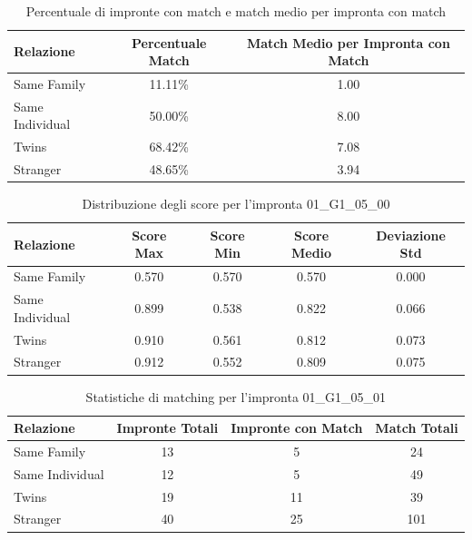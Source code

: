 \begin{table}[htbp]
\centering
\caption{Percentuale di impronte con match e match medio per impronta con match}
\label{tab:match_percentage_01_G1_05_00}
\begin{tabular}{|l|c|c|}
\hline
\textbf{Relazione} & \textbf{Percentuale Match} & \textbf{Match Medio per Impronta con Match} \\
\hline
Same Family & 11.11\% & 1.00 \\
\hline
Same Individual & 50.00\% & 8.00 \\
\hline
Twins & 68.42\% & 7.08 \\
\hline
Stranger & 48.65\% & 3.94 \\
\hline
\end{tabular}
\end{table}


\begin{table}[htbp]
\centering
\caption{Distribuzione degli score per l'impronta 01\_G1\_05\_00}
\label{tab:scores_01_G1_05_00}
\begin{tabular}{|l|c|c|c|c|}
\hline
\textbf{Relazione} & \textbf{Score Max} & \textbf{Score Min} & \textbf{Score Medio} & \textbf{Deviazione Std} \\
\hline
Same Family & 0.570 & 0.570 & 0.570 & 0.000 \\
\hline
Same Individual & 0.899 & 0.538 & 0.822 & 0.066 \\
\hline
Twins & 0.910 & 0.561 & 0.812 & 0.073 \\
\hline
Stranger & 0.912 & 0.552 & 0.809 & 0.075 \\
\hline
\end{tabular}
\end{table}


\begin{table}[htbp]
\centering
\caption{Statistiche di matching per l'impronta 01\_G1\_05\_01}
\label{tab:results_01_G1_05_01}
\begin{tabular}{|l|c|c|c|}
\hline
\textbf{Relazione} & \textbf{Impronte Totali} & \textbf{Impronte con Match} & \textbf{Match Totali} \\
\hline
Same Family & 13 & 5 & 24 \\
\hline
Same Individual & 12 & 5 & 49 \\
\hline
Twins & 19 & 11 & 39 \\
\hline
Stranger & 40 & 25 & 101 \\
\hline
\end{tabular}
\end{table}


